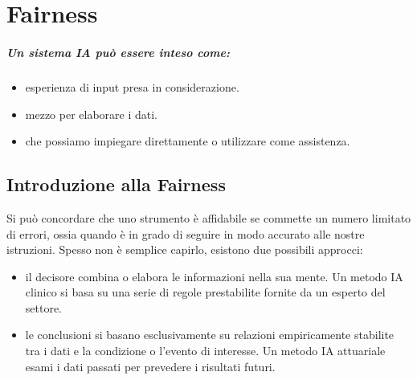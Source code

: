 \chapter{Fairness}


\paragraph{Un sistema IA può essere inteso come:}

\begin{itemize}
  \item {} esperienza di input presa in considerazione. 
  \item {} mezzo per elaborare i dati. 
  \item {} che possiamo impiegare direttamente o utilizzare come assistenza. 
\end{itemize}



\section{Introduzione alla Fairness}

Si può concordare che uno strumento è affidabile se commette un numero limitato di errori, ossia quando è in grado di seguire in modo accurato alle nostre istruzioni. Spesso non è semplice capirlo, esistono due possibili approcci:

\begin{itemize}
  \item {} il decisore combina o elabora le informazioni nella sua mente. Un metodo IA clinico si basa su una serie di regole prestabilite fornite da un esperto del settore. 
  \item {} le conclusioni si basano esclusivamente su relazioni empiricamente stabilite tra i dati e la condizione o l'evento di interesse. Un metodo IA attuariale esami i dati passati per prevedere i risultati futuri. 
\end{itemize}


